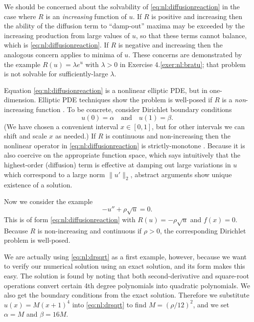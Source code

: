 We should be concerned about the solvability of \eqref{eq:nl:diffusionreaction} in the case where $R$ is an \emph{increasing} function of $u$.  If $R$ is positive and increasing then the ability of the diffusion term to ``damp-out'' maxima may be exceeded by the increasing production from large values of $u$, so that these terms cannot balance, which is \eqref{eq:nl:diffusionreaction}.  If $R$ is negative and increasing then the analogous concern applies to minima of $u$.  These concerns are demonstrated by the example $R(u) = \lambda e^u$ with $\lambda>0$ in Exercise 4.\ref{exer:nl:bratu}; that problem is not solvable for sufficiently-large $\lambda$.  

Equation \eqref{eq:nl:diffusionreaction} is a nonlinear elliptic PDE, but in one-dimension.  Elliptic PDE techniques show the problem is well-posed if $R$ is a \emph{non}-increasing function \citep[pages 93-94]{KinderlehrerStampacchia1980}.  To be concrete, consider Dirichlet boundary conditions
\begin{equation}
u(0)=\alpha \quad \text{and} \quad u(1)=\beta.  \label{eq:nl:drbcs}
\end{equation}
(We have chosen a convenient interval $x\in[0,1]$, but for other intervals we can shift and scale $x$ as needed.)  If $R$ is continuous and non-increasing then the nonlinear operator in \eqref{eq:nl:diffusionreaction} is strictly-monotone \citep{KinderlehrerStampacchia1980}.  Because it is also coercive on the appropriate function space, which says intuitively that the highest-order (diffusion) term is effective at damping out large variations in $u$ which correspond to a large norm $\|u'\|_2$, abstract arguments show unique existence of a solution.

Now we consider the example
\begin{equation}
-u'' + \rho \sqrt{u} = 0. \label{eq:nl:drsqrt}
\end{equation}
This is of form \eqref{eq:nl:diffusionreaction} with $R(u) = - \rho \sqrt{u}$ and $f(x)=0$.  Because $R$ is non-increasing and continuous if $\rho>0$, the corresponding Dirichlet problem is well-posed.

We are actually using \eqref{eq:nl:drsqrt} as a first example, however, because we want to verify our numerical solution using an exact solution, and its form makes this easy.  The solution is found \citep{Ockendonetal2003} by noting that both second-derivative and square-root operations convert certain 4th degree polynomials into quadratic polynomials.  We also get the boundary conditions from the exact solution.  Therefore we substitute $u(x)=M(x+1)^4$ into \eqref{eq:nl:drsqrt} to find $M=(\rho/12)^2$, and we set $\alpha=M$ and $\beta=16 M$.

